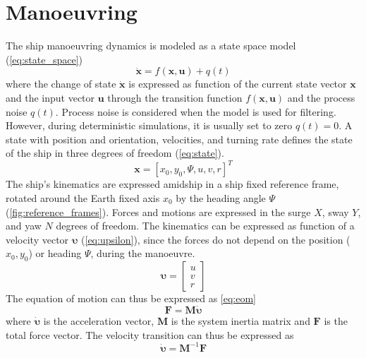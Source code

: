 \section{Manoeuvring} \label{sec:manoeuvring}
The ship manoeuvring dynamics is modeled as a state space model (\autoref{eq:state_space})
\begin{equation}
    \dot{\mathbf{x}}=f(\mathbf{x},\mathbf{u}) + q(t)
    \label{eq:state_space}
\end{equation}
where the change of state $\dot{\mathbf{x}}$ is expressed as function of the current state vector $\mathbf{x}$ and the input vector $\mathbf{u}$ through the transition function $f(\mathbf{x},\mathbf{u})$ and the process noise $q(t)$.  Process noise is considered when the model is used for filtering. However,  during deterministic simulations, it is usually set to zero $q(t)=0$.
A state with position and orientation, velocities, and turning rate defines the state of the ship in three degrees of freedom (\autoref{eq:state}). 
\begin{equation}
    \mathbf{x} = [x_0,y_0,\Psi, u,v,r]^T
    \label{eq:state}
\end{equation}
The ship’s kinematics are expressed amidship in a ship fixed reference frame, rotated around the Earth fixed axis $x_0$ by the heading angle $\Psi$ (\autoref{fig:reference_frames}). Forces and motions are expressed in the surge $X$, sway $Y$, and yaw $N$ degrees of freedom. The kinematics can be expressed as function of a velocity vector $\pmb{\upsilon}$ (\autoref{eq:upsilon}), since the forces do not depend on the position ($x_0,y_0$) or heading $\Psi$, during the manoeuvre.
\begin{equation}
    \label{eq:upsilon}
    \pmb{\upsilon} = \left[\begin{matrix}u\\v\\r\end{matrix}\right]
\end{equation}
The equation of motion can thus be expressed as \autoref{eq:eom}
\begin{equation}
    \label{eq:eom}
    \mathbf{F} = \mathbf{M}  \pmb{\dot{\upsilon}} 
\end{equation}
where $\pmb{\dot{\upsilon}}$ is the acceleration vector, $\mathbf{M}$ is the system inertia matrix and $\mathbf{F}$ is the total force vector.
The velocity transition can thus be expressed as
\begin{equation}
    \label{eq:acc}
    \pmb{\dot{\upsilon}} = \mathbf{M}^{-1}\mathbf{F}
\end{equation}
